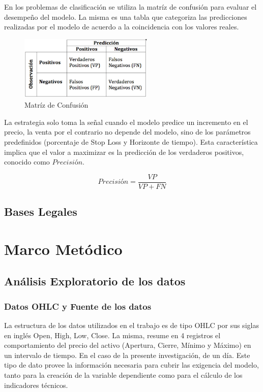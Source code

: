 \documentclass[a4paper,12pt]{Latex/Classes/PhDthesisPSnPDF}
\begin{document}
En los problemas de clasificación se utiliza la matríz de confusión para evaluar el desempeño del modelo. La misma es una tabla que categoriza las predicciones realizadas por el modelo de acuerdo a la coincidencia con los valores reales. 

\begin{figure}[ht]
\begin{center}
\includegraphics[width=2.5in]{images/confusion_matrix}
\end{center}
\caption{Matríz de Confusión}
\end{figure}

La estrategia solo toma la señal cuando el modelo predice un incremento en el precio, la venta por el contrario no depende del modelo, sino de los parámetros predefinidos (porcentaje de Stop Loss y Horizonte de tiempo). Esta característica implica que el valor a maximizar es la predicción de los verdaderos positivos, conocido como $Precisión$.

$$ Precisión = \frac{VP}{VP + FN} $$

\section{Bases Legales}



\chapter{Marco Metódico}
\section{Análisis Exploratorio de los datos}

\subsection{Datos OHLC y Fuente de los datos}

La estructura de los datos utilizados en el trabajo es de tipo OHLC por sus siglas en inglés Open, High, Low, Close. La misma, resume en 4 registros el comportamiento del precio del activo (Apertura, Cierre, Mínimo y Máximo) en un intervalo de tiempo. En el caso de la presente investigación, de un día. Este tipo de dato provee la información necesaria para cubrir las exigencia del modelo, tanto para la creación de la variable dependiente como para el cálculo de los indicadores técnicos. 
\end{document}
